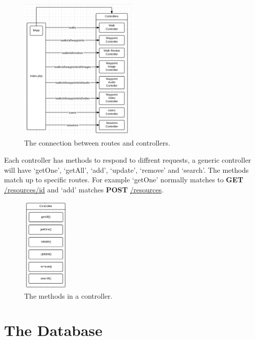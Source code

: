 \documentclass[11pt,a4paper]{report}
\begin{document}
\begin{figure}[H]
    \centering
    \includegraphics[width=0.5\textwidth]{ControllerRoutes}
    \caption{The connection between routes and controllers.}
    \label{fig:controllerroutes}
\end{figure}

Each controller has methods to respond to diffrent requests, a generic controller will have `getOne', `getAll', `add', `update', `remove' and `search'. The methods match up to specific routes. For example `getOne' normally matches to \textbf{GET} \url{/resources/id} and `add' matches \textbf{POST} \url{/resources}. 

\begin{figure}[H]
    \centering
    \includegraphics[width=0.2\textwidth]{ControllerMethods}
    \caption{The methods in a controller.}
    \label{fig:controllermethods}
\end{figure}

\section{The Database}
\label{sec:database-design}
\end{document}
